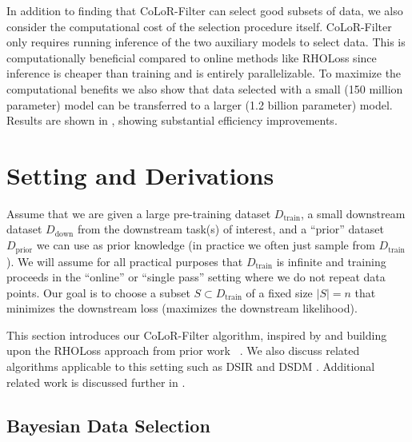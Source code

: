 \documentclass{article}
\newcommand{\Dprior}{D_{\text{prior}}}
\newcommand{\Ddown}{D_{\text{down}}}
\newcommand{\Dtrain}{D_{\text{train}}}
\begin{document}
In addition to finding that CoLoR-Filter can select good subsets of data, we also consider the computational cost of the selection procedure itself. CoLoR-Filter only requires running inference of the two auxiliary models to select data. This is computationally beneficial compared to online methods like RHOLoss \citep{mindermann2022prioritized} since inference is cheaper than training and is entirely parallelizable. To maximize the computational benefits we also show that data selected with a small (150 million parameter) model can be transferred to a larger (1.2 billion parameter) model. Results are shown in , showing substantial efficiency improvements. 




\section{Setting and Derivations}\label{sec:derivations}

Assume that we are given a large pre-training dataset $ \Dtrain$, a small downstream dataset $ \Ddown$ from the downstream task(s) of interest, and a ``prior'' dataset $ \Dprior$ we can use as prior knowledge (in practice we often just sample from $ \Dtrain$). 
We will assume for all practical purposes that $ \Dtrain$ is infinite and training proceeds in the ``online'' or ``single pass'' setting where we do not repeat data points.
Our goal is to choose a subset $ S \subset \Dtrain$ of a fixed size $ |S| = n $ that minimizes the downstream loss (maximizes the downstream likelihood).


This section introduces our CoLoR-Filter algorithm, inspired by and building upon the RHOLoss approach from prior work ~\citep{mindermann2022prioritized,evans2023bad}. We also discuss related algorithms applicable to this setting such as DSIR \citep{xie2023data} and DSDM \citep{engstrom2024dsdm}. Additional related work is discussed further in .

\subsection{Bayesian Data Selection}
\end{document}
